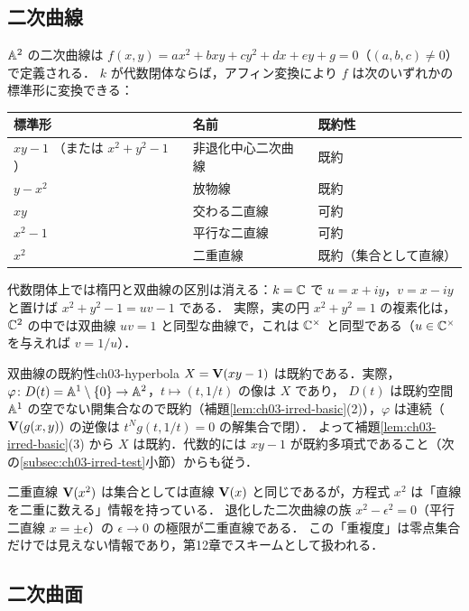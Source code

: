 \subsection{二次曲線}

$\mathbb{A}^2$ の二次曲線は $f(x,y)=ax^2+bxy+cy^2+dx+ey+g=0$（$(a,b,c)\ne0$）で定義される．
$k$ が代数閉体ならば，アフィン変換により $f$ は次のいずれかの標準形に変換できる：
\begin{center}
\begin{tabular}{lll}
標準形 & 名前 & 既約性 \\ \hline
$xy-1$ （または $x^2+y^2-1$） & 非退化中心二次曲線 & 既約 \\
$y-x^2$ & 放物線 & 既約 \\
$xy$ & 交わる二直線 & 可約 \\
$x^2-1$ & 平行な二直線 & 可約 \\
$x^2$ & 二重直線 & 既約（集合として直線）
\end{tabular}
\end{center}
代数閉体上では楕円と双曲線の区別は消える：$k=\mathbb{C}$ で $u=x+iy$，$v=x-iy$ と置けば $x^2+y^2-1=uv-1$ である．
実際，実の円 $x^2+y^2=1$ の複素化は，$\mathbb{C}^2$ の中では双曲線 $uv=1$ と同型な曲線で，これは $\mathbb{C}^\times$ と同型である（$u\in\mathbb{C}^\times$ を与えれば $v=1/u$）．

\begin{myex}{双曲線の既約性}{ch03-hyperbola}
$X=\mathbf{V}(xy-1)$ は既約である．実際，$\varphi\colon D(t)=\mathbb{A}^1\setminus\{0\}\to\mathbb{A}^2$，$t\mapsto(t,1/t)$ の像は $X$ であり，
$D(t)$ は既約空間 $\mathbb{A}^1$ の空でない開集合なので既約（補題\ref{lem:ch03-irred-basic}(2)），$\varphi$ は連続（$\mathbf{V}(g(x,y))$ の逆像は $t^Ng(t,1/t)=0$ の解集合で閉）．
よって補題\ref{lem:ch03-irred-basic}(3) から $X$ は既約．代数的には $xy-1$ が既約多項式であること（次の\ref{subsec:ch03-irred-test}小節）からも従う．
\end{myex}

二重直線 $\mathbf{V}(x^2)$ は集合としては直線 $\mathbf{V}(x)$ と同じであるが，方程式 $x^2$ は「直線を二重に数える」情報を持っている．
退化した二次曲線の族 $x^2-\epsilon^2=0$（平行二直線 $x=\pm\epsilon$）の $\epsilon\to0$ の極限が二重直線である．
この「重複度」は零点集合だけでは見えない情報であり，第12章でスキームとして扱われる．

\subsection{二次曲面}

